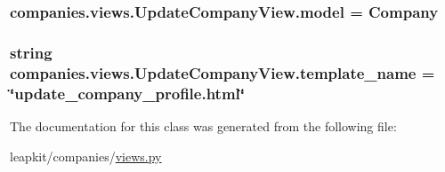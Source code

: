 \hypertarget{classcompanies_1_1views_1_1_update_company_view_a68b2d9606aa44d6baf09344b67285a72}{
\subsubsection[{model}]{\setlength{\rightskip}{0pt plus 5cm}companies.\-views.\-Update\-Company\-View.\-model = Company\hspace{0.3cm}{\ttfamily [static]}}}\label{classcompanies_1_1views_1_1_update_company_view_a68b2d9606aa44d6baf09344b67285a72}
\hypertarget{classcompanies_1_1views_1_1_update_company_view_a349f9cda744c114bb31a87a8163f7ddd}{
\subsubsection[{template\-\_\-name}]{\setlength{\rightskip}{0pt plus 5cm}string companies.\-views.\-Update\-Company\-View.\-template\-\_\-name = \char`\"{}update\-\_\-company\-\_\-profile.\-html\char`\"{}\hspace{0.3cm}{\ttfamily [static]}}}\label{classcompanies_1_1views_1_1_update_company_view_a349f9cda744c114bb31a87a8163f7ddd}


The documentation for this class was generated from the following file\-:\begin{DoxyCompactItemize}
\item 
leapkit/companies/\hyperlink{companies_2views_8py}{views.\-py}\end{DoxyCompactItemize}
